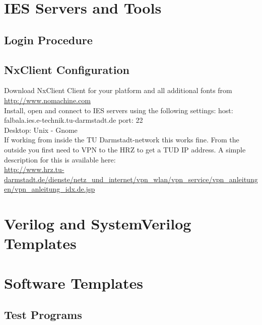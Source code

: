 
\newpage
\begin{appendix}
\section{IES Servers and Tools}
\subsection{Login Procedure}


\subsection{NxClient Configuration}
Download NxClient Client for your platform and all additional fonts from \\
\url{http://www.nomachine.com}\\
Install, open and connect to IES servers using the following settings:
host:	falbala.ies.e-technik.tu-darmstadt.de \quad port:	22\\
Desktop: Unix - Gnome\\
If working from inside the TU Darmstadt-network this works fine. From the outside you first need to VPN to the HRZ to get a TUD IP address. A simple description for this is available here:\\
\url{http://www.hrz.tu-darmstadt.de/dienste/netz_und_internet/vpn_wlan/vpn_service/vpn_anleitungen/vpn_anleitung_idx.de.jsp}

\newpage
\section{Verilog and SystemVerilog Templates}

\newpage

\newpage


\newpage
\section{Software Templates}
\subsection{Test Programs}
\label{c:count32}
\label{c:count32.dasm}\newpage
\label{c:count32.bin}\newpage
\label{c:count32.gold}\newpage
\newpage
\label{c:memcpy46}
\label{c:memcpy46.dasm}


\end{appendix}
